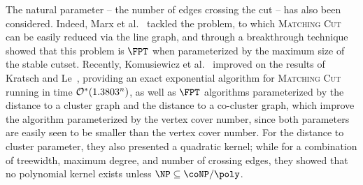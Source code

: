 The natural parameter -- the number of edges crossing the cut -- has also been considered.
Indeed, Marx et al.~\cite{marx_treewidth_reduction} tackled the  problem, to which \textsc{Matching Cut} can be easily reduced via the line graph, and through a breakthrough technique showed that this problem is $\FPT$ when parameterized by the maximum size of the stable cutset.
Recently, Komusiewicz et al.~\cite{matching_cut_ipec} improved on the results of Kratsch and Le~\cite{matching_cut_tcs}, providing an exact exponential algorithm for \textsc{Matching Cut} running in  time $\mathcal{O}^*\!\left(1.3803^n\right)$, as well as $\FPT$ algorithms parameterized by the distance to a cluster graph and the distance to a co-cluster graph, which improve the algorithm parameterized by the vertex cover number, since both parameters are easily seen to be smaller than the vertex cover number.
For the distance to cluster parameter, they also presented a quadratic kernel; while for a combination of treewidth, maximum degree, and number of crossing edges, they showed that no polynomial kernel exists unless $\NP \subseteq \coNP/\poly$.

